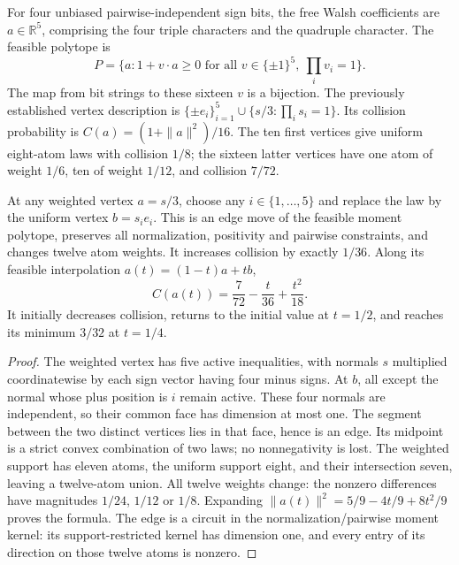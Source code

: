 
For four unbiased pairwise-independent sign bits, the free Walsh
coefficients are $a\in\mathbb R^5$, comprising the four triple
characters and the quadruple character. The feasible polytope is
\[
 P=\{a:1+v\cdot a\ge0\text{ for all }v\in\{\pm1\}^5,
 \ \prod_i v_i=1\}.
\]
The map from bit strings to these sixteen $v$ is a bijection.
The previously established vertex description is
$\{\pm e_i\}_{i=1}^5\cup\{s/3:\prod_i s_i=1\}$.
Its collision probability is $C(a)=(1+\|a\|^2)/16$.
The ten first vertices give uniform eight-atom laws with collision
$1/8$; the sixteen latter vertices have one atom of weight $1/6$,
ten of weight $1/12$, and collision $7/72$.

\begin{theorem}
At any weighted vertex $a=s/3$, choose any $i\in\{1,\ldots,5\}$
and replace the law by the uniform vertex $b=s_i e_i$.
This is an edge move of the feasible moment polytope, preserves all
normalization, positivity and pairwise constraints, and changes
twelve atom weights. It increases collision by exactly $1/36$.
Along its feasible interpolation $a(t)=(1-t)a+tb$,
\[
 C(a(t))=\frac7{72}-\frac{t}{36}+\frac{t^2}{18}.
\]
It initially decreases collision, returns to the initial value at
$t=1/2$, and reaches its minimum $3/32$ at $t=1/4$.
\end{theorem}
\begin{proof}
The weighted vertex has five active inequalities, with normals
$s$ multiplied coordinatewise by each sign vector having four minus
signs. At $b$, all except the normal whose plus position is $i$
remain active. These four normals are independent, so their common
face has dimension at most one. The segment between the two distinct
vertices lies in that face, hence is an edge. Its midpoint is a
strict convex combination of two laws; no nonnegativity is lost.
The weighted support has eleven atoms, the uniform support eight,
and their intersection seven, leaving a twelve-atom union.
All twelve weights change: the nonzero differences have magnitudes
$1/24$, $1/12$ or $1/8$. Expanding
$\|a(t)\|^2=5/9-4t/9+8t^2/9$ proves the formula.
The edge is a circuit in the normalization/pairwise moment kernel:
its support-restricted kernel has dimension one, and every entry of
its direction on those twelve atoms is nonzero.
\end{proof}

